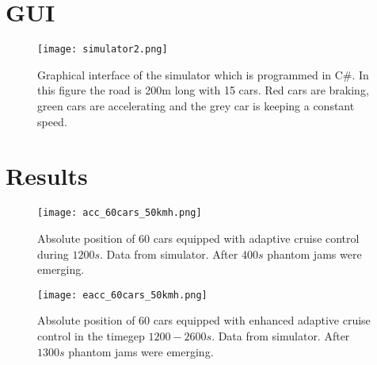 \section{GUI}
\label{gui}
\begin{figure}[H]
    \begin{center}
    \texttt{[image: simulator2.png]}
    \caption{Graphical interface of the simulator which is programmed in C\#. In this figure the road is 200m long with 15 cars. Red cars are braking, green cars are accelerating and the grey car is keeping a constant speed.}
    \end{center}
\end{figure}
\section{Results}
\label{app_postime_plot}
\begin{figure}[H]
    \begin{center}
    \texttt{[image: acc\_60cars\_50kmh.png]}
    \caption{\label{acc_postime}
Absolute position of 60 cars equipped with adaptive cruise control during $ 1200
\unit{s} $. Data from simulator. After $ 400 \unit{s} $ phantom jams were emerging.}
    \end{center}
\end{figure}
\begin{figure}[H]
    \begin{center}
    \texttt{[image: eacc\_60cars\_50kmh.png]}
    \caption{\label{eacc_postime}
Absolute position of 60 cars equipped with enhanced adaptive cruise control in
the timegep $ 1200 - 2600 \unit{s} $. Data from simulator. After $ 1300 \unit{s}
$ phantom jams were emerging.}
    \end{center}
\end{figure}
